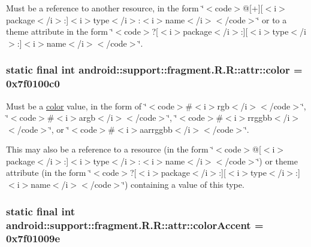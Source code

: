 Must be a reference to another resource, in the form \char`\"{}$<$code$>$@\mbox{[}+\mbox{]}\mbox{[}$<$i$>$package$<$/i$>$:\mbox{]}$<$i$>$type$<$/i$>$:$<$i$>$name$<$/i$>$$<$/code$>$\char`\"{} or to a theme attribute in the form \char`\"{}$<$code$>$?\mbox{[}$<$i$>$package$<$/i$>$:\mbox{]}\mbox{[}$<$i$>$type$<$/i$>$:\mbox{]}$<$i$>$name$<$/i$>$$<$/code$>$\char`\"{}. \hypertarget{classandroid_1_1support_1_1fragment_1_1_r_1_1attr_d103e81f4608c0d4098736c9a763cc1b}{
\subsubsection[{color}]{\setlength{\rightskip}{0pt plus 5cm}static final int android::support::fragment.R.R::attr::color = 0x7f0100c0}}
\label{classandroid_1_1support_1_1fragment_1_1_r_1_1attr_d103e81f4608c0d4098736c9a763cc1b}


Must be a \hyperlink{classandroid_1_1support_1_1fragment_1_1_r_1_1color}{color} value, in the form of \char`\"{}$<$code$>$\#$<$i$>$rgb$<$/i$>$$<$/code$>$\char`\"{}, \char`\"{}$<$code$>$\#$<$i$>$argb$<$/i$>$$<$/code$>$\char`\"{}, \char`\"{}$<$code$>$\#$<$i$>$rrggbb$<$/i$>$$<$/code$>$\char`\"{}, or \char`\"{}$<$code$>$\#$<$i$>$aarrggbb$<$/i$>$$<$/code$>$\char`\"{}. 

This may also be a reference to a resource (in the form \char`\"{}$<$code$>$@\mbox{[}$<$i$>$package$<$/i$>$:\mbox{]}$<$i$>$type$<$/i$>$:$<$i$>$name$<$/i$>$$<$/code$>$\char`\"{}) or theme attribute (in the form \char`\"{}$<$code$>$?\mbox{[}$<$i$>$package$<$/i$>$:\mbox{]}\mbox{[}$<$i$>$type$<$/i$>$:\mbox{]}$<$i$>$name$<$/i$>$$<$/code$>$\char`\"{}) containing a value of this type. \hypertarget{classandroid_1_1support_1_1fragment_1_1_r_1_1attr_e19b8b53d256a44d46804f6d66f65a24}{
\subsubsection[{colorAccent}]{\setlength{\rightskip}{0pt plus 5cm}static final int android::support::fragment.R.R::attr::colorAccent = 0x7f01009e}}
\label{classandroid_1_1support_1_1fragment_1_1_r_1_1attr_e19b8b53d256a44d46804f6d66f65a24}


